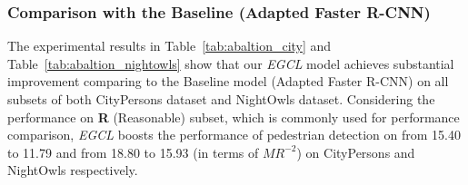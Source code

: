 \documentclass[journal]{IEEEtran}
\begin{document}
\begin{table}[!t]
\centering
\caption{Ablation study of our \emph{EGCL} model on NightOwls validation set in terms of $MR^{-2}$ (lower is better). Baseline refers to Adapted Faster R-CNN. Note that the performance of Baseline model is achieved based on our implementation since no official results are reported. For all results, lower is better.}
\renewcommand\arraystretch{3} 
\label{tab:abaltion_nightowls}
\end{table}

\subsubsection{Comparison with the Baseline (Adapted Faster R-CNN)}
The experimental results in Table~\ref{tab:abaltion_city} and Table~\ref{tab:abaltion_nightowls} show that our \emph{EGCL} model achieves substantial improvement comparing to the Baseline model (Adapted Faster R-CNN) on all subsets of both CityPersons dataset and NightOwls dataset. Considering the performance on \textbf{R} (Reasonable) subset, which is commonly used for performance comparison, \emph{EGCL} boosts the performance of pedestrian detection on  from 15.40 to 11.79 and from 18.80 to 15.93 (in terms of $MR^{-2}$) on CityPersons and NightOwls respectively.
\end{document}
